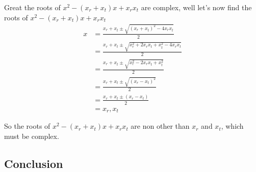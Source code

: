 \documentclass[12pt]{article}
\begin{document}
Great the roots of $x^2 - (x_r +x_t)x + x_r x_t$ are complex, well let's now find the roots of $x^2 - (x_r +x_t)x + x_r x_t$
\begin{align*}
x &= \frac{x_r+x_t \pm \sqrt{(x_r+x_t)^2-4x_rx_t}}{2} \\
&= \frac{x_r+x_t \pm \sqrt{x_r^2 +2x_rx_t+x_t^2-4x_rx_t}}{2} \\
&= \frac{x_r+x_t \pm \sqrt{x_r^2 - 2 x_r x_t +x_t^2}}{2} \\
&= \frac{x_r +x_t \pm \sqrt{(x_r-x_t)^2}}{2} \\
&= \frac{x_r + x_t \pm (x_r-x_t)}{2} \\
&= x_r, x_t
\end{align*}

So the roots of $x^2 - (x_r +x_t)x + x_r x_t$ are non other than $x_r$ and $x_t$, which must be complex.

\subsection*{Conclusion}


\end{document}
